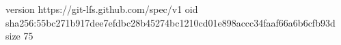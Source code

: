 version https://git-lfs.github.com/spec/v1
oid sha256:55bc271b917dee7efdbc28b45274bc1210cd01e898accc34faaf66a6b6cfb93d
size 75
